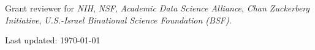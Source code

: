 \documentclass[11pt,fullpage]{article}
\begin{document}
\vspace{4pt}

Grant reviewer for \emph{NIH}, \emph{NSF}, \emph{Academic Data Science Alliance}, \emph{Chan Zuckerberg Initiative}, \emph{U.S.-Israel Binational Science Foundation (BSF)}.

\bigskip
\begin{center}
  \begin{footnotesize}
    Last updated: \today
  \end{footnotesize}
\end{center}

\end{document}
